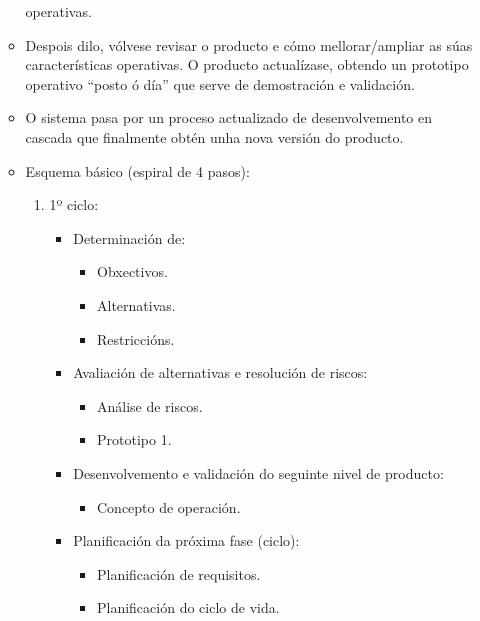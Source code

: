 \begin{itemize}
\begin{itemize}
              operativas.
        \item Despois dilo, vólvese revisar o producto e cómo mellorar/ampliar
              as súas características operativas. O producto actualízase,
              obtendo un prototipo operativo “posto ó día” que serve de
              demostración e validación.
        \item O sistema pasa por un proceso actualizado de desenvolvemento en
              cascada que finalmente obtén unha nova versión do producto.
        \item Esquema básico (espiral de 4 pasos):
              \begin{enumerate}
               \item 1º ciclo:
                     \begin{itemize}
                      \item Determinación de:
                            \begin{itemize}
                             \item Obxectivos.
                             \item Alternativas.
                             \item Restriccións.
                            \end{itemize}
                      \item Avaliación de alternativas e resolución de riscos:
                            \begin{itemize}
                             \item Análise de riscos.
                             \item Prototipo 1.
                            \end{itemize}
                      \item Desenvolvemento e validación do seguinte nivel de
                            producto:
                            \begin{itemize}
                             \item Concepto de operación.
                            \end{itemize}
                      \item Planificación da próxima fase (ciclo):
                            \begin{itemize}
                             \item Planificación de requisitos.
                             \item Planificación do ciclo de vida.

\end{itemize}
\end{itemize}
\end{enumerate}
\end{itemize}
\end{itemize}
